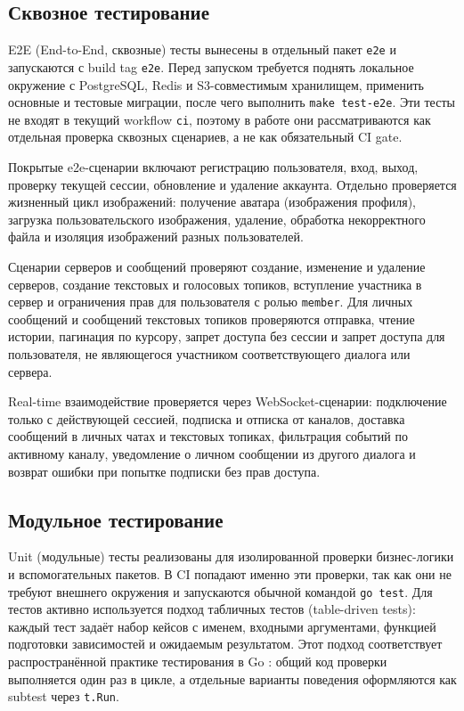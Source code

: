 \documentclass[a4paper,12pt]{extarticle}
\begin{document}
\subsection{Сквозное тестирование}

E2E (End-to-End, сквозные) тесты вынесены в отдельный пакет \texttt{e2e} и запускаются с build tag \texttt{e2e}. Перед запуском требуется поднять локальное окружение с PostgreSQL, Redis и S3-совместимым хранилищем, применить основные и тестовые миграции, после чего выполнить \texttt{make test-e2e}. Эти тесты не входят в текущий workflow \texttt{ci}, поэтому в работе они рассматриваются как отдельная проверка сквозных сценариев, а не как обязательный CI gate.

Покрытые e2e-сценарии включают регистрацию пользователя, вход, выход, проверку текущей сессии, обновление и удаление аккаунта. Отдельно проверяется жизненный цикл изображений: получение аватара (изображения профиля), загрузка пользовательского изображения, удаление, обработка некорректного файла и изоляция изображений разных пользователей.

Сценарии серверов и сообщений проверяют создание, изменение и удаление серверов, создание текстовых и голосовых топиков, вступление участника в сервер и ограничения прав для пользователя с ролью \texttt{member}. Для личных сообщений и сообщений текстовых топиков проверяются отправка, чтение истории, пагинация по курсору, запрет доступа без сессии и запрет доступа для пользователя, не являющегося участником соответствующего диалога или сервера.

Real-time взаимодействие проверяется через WebSocket-сценарии: подключение только с действующей сессией, подписка и отписка от каналов, доставка сообщений в личных чатах и текстовых топиках, фильтрация событий по активному каналу, уведомление о личном сообщении из другого диалога и возврат ошибки при попытке подписки без прав доступа.

\subsection{Модульное тестирование}

Unit (модульные) тесты реализованы для изолированной проверки бизнес-логики и вспомогательных пакетов. В CI попадают именно эти проверки, так как они не требуют внешнего окружения и запускаются обычной командой \texttt{go test}. Для тестов активно используется подход табличных тестов (table-driven tests): каждый тест задаёт набор кейсов с именем, входными аргументами, функцией подготовки зависимостей и ожидаемым результатом. Этот подход соответствует распространённой практике тестирования в Go \cite{go_table_driven_tests}: общий код проверки выполняется один раз в цикле, а отдельные варианты поведения оформляются как subtest через \texttt{t.Run}.
\end{document}
